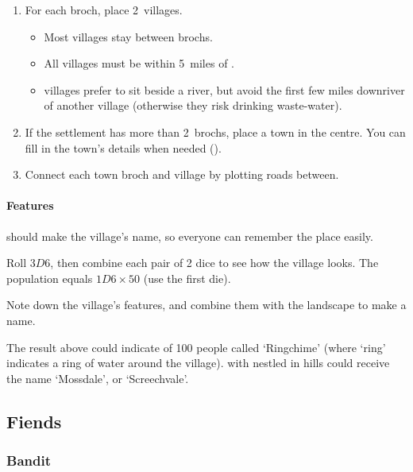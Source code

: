\begin{multicols}{2}
\begin{enumerate}
  \item
  For each \gls{broch}, place 2~\glspl{village}.
  \begin{itemize}
    \item
    Most \glspl{village} stay between \glspl{broch}.
    \item
    All \glspl{village} must be within 5~miles of .
    \item
    \Glspl{village} prefer to sit beside a river, but avoid the first few miles downriver of another \gls{village} (otherwise they risk drinking waste-water).
  \end{itemize}
  \item
  If the settlement has more than 2~\glspl{broch}, place a town in the centre.
  You can fill in the town's details when needed ().
  \item
  Connect each town \gls{broch} and \gls{village} by plotting roads between.
\end{enumerate}

\paragraph{ Features}
\label{villageFeatures}
should make the \gls{village}'s name, so everyone can remember the place easily.

Roll $3D6$, then combine each pair of 2 dice to see how the \gls{village} looks.
The population equals $1D6 \times 50$ (use the first die).

\encVillageFeatures

Note down the \gls{village}'s features, and combine them with the landscape to make a name.


The result above could indicate  of 100 people called `Ringchime' (where `ring' indicates a ring of water around the \gls{village}).
 with  nestled in hills could receive the name `Mossdale', or `Screechvale'.

\subsection{Fiends}
\label{mapFiends}

\subsubsection{Bandit }
\label{banditsPoint}


\end{multicols}
